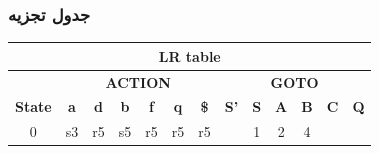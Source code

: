 \documentclass{article}
\begin{document}
\subsubsection{جدول تجزیه}
\begin{latin}
\begin{table}[H]
\begin{tabular}{|ccccccccccccc|}
\hline
\multicolumn{13}{|c|}{\textbf{LR table}}                                                                                                                                                                                                                                                                                                                                                                                                                                                                                                           \\ \hline
\multicolumn{1}{|c|}{}                                 & \multicolumn{6}{c|}{\textbf{ACTION}}                                                                                                                                                                                      & \multicolumn{6}{c|}{\textbf{GOTO}}                                                                                                                                                                                                                            \\ \cline{2-13} 
\multicolumn{1}{|c|}{\multirow{-2}{*}{\textbf{State}}} & \multicolumn{1}{c|}{\textbf{a}} & \multicolumn{1}{c|}{\textbf{d}} & \multicolumn{1}{c|}{\textbf{b}} & \multicolumn{1}{c|}{\textbf{f}} & \multicolumn{1}{c|}{\textbf{q}} & \multicolumn{1}{c|}{\textbf{\$}}                & \multicolumn{1}{c|}{\textbf{S'}} & \multicolumn{1}{c|}{\textbf{S}}               & \multicolumn{1}{c|}{\textbf{A}}               & \multicolumn{1}{c|}{\textbf{B}}                & \multicolumn{1}{c|}{\textbf{C}}                & \textbf{Q}               \\ \hline
\multicolumn{1}{|c|}{{\color[HTML]{0000FF} 0}}         & \multicolumn{1}{c|}{s3}         & \multicolumn{1}{c|}{r5}         & \multicolumn{1}{c|}{s5}         & \multicolumn{1}{c|}{r5}         & \multicolumn{1}{c|}{r5}         & \multicolumn{1}{c|}{r5}                         & \multicolumn{1}{c|}{}            & \multicolumn{1}{c|}{{\color[HTML]{0000FF} 1}} & \multicolumn{1}{c|}{{\color[HTML]{0000FF} 2}} & \multicolumn{1}{c|}{{\color[HTML]{0000FF} 4}}  & \multicolumn{1}{c|}{}                          &                          \\ \hline

\end{tabular}
\end{table}
\end{latin}
\end{document}
